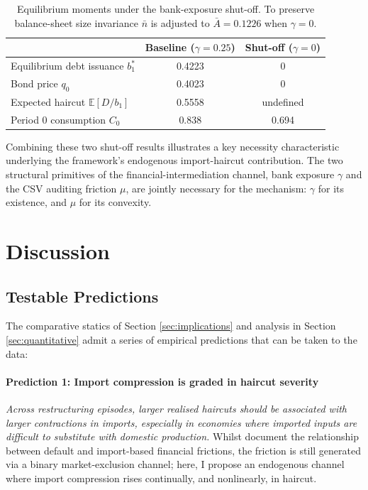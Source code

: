 \documentclass[11pt]{article}
\theoremstyle{definition}
\theoremstyle{plain}
\theoremstyle{remark}
\begin{document}
\begin{table}[ht]
\centering
\begin{tabular}{lcc}
\toprule
& Baseline ($\gamma = 0.25$) & Shut-off ($\gamma = 0$) \\
\midrule
Equilibrium debt issuance $b_1^*$       & 0.4223 & 0 \\
Bond price $q_0$                         & 0.4023 & 0 \\
Expected haircut $\mathbb{E}[D/b_1]$     & 0.5558 & undefined \\
Period 0 consumption $C_0$               & 0.838  & 0.694 \\
\bottomrule
\end{tabular}
\caption{Equilibrium moments under the bank-exposure shut-off. To preserve balance-sheet size invariance $\bar{n}$ is adjusted to $\bar{A} = 0.1226$ when $\gamma = 0$.}
\label{tab:gamma_shutoff}
\end{table}

Combining these two shut-off results illustrates a key necessity characteristic underlying the framework's endogenous import-haircut contribution. The two structural primitives of the financial-intermediation channel, bank exposure $\gamma$ and the CSV auditing friction $\mu$, are jointly necessary for the mechanism: $\gamma$ for its existence, and $\mu$ for its convexity.


\section{Discussion} \label{sec:discussion}

\subsection{Testable Predictions}\label{sec:predictions}

The comparative statics of Section \ref{sec:implications} and analysis in Section \ref{sec:quantitative} admit a series of empirical predictions that can be taken to the data:

\paragraph{Prediction 1: Import compression is graded in haircut severity}
\emph{Across restructuring episodes, larger realised haircuts should be associated with larger contractions in imports, especially in economies where imported inputs are difficult to substitute with domestic production.} Whilst \citet{mendoza_general_2012} document the relationship between default and import-based financial frictions, the friction is still generated via a binary market-exclusion channel; here, I propose an endogenous channel where import compression rises continually, and nonlinearly, in haircut.
\end{document}
